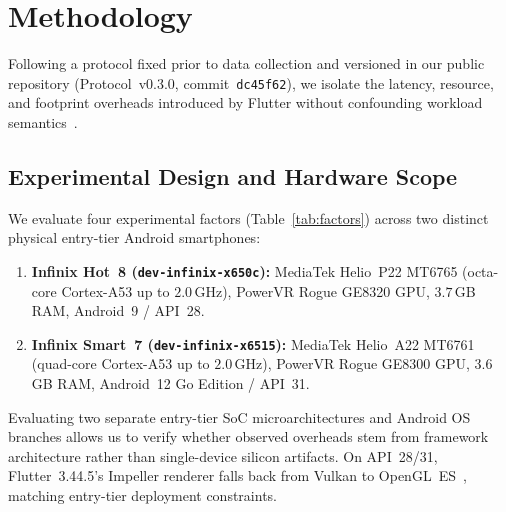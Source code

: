 \section{Methodology}\label{sec:method}

Following a protocol fixed prior to data collection and versioned in our public repository (Protocol~v0.3.0, commit~\texttt{dc45f62}), we isolate the latency, resource, and footprint overheads introduced by Flutter without confounding workload semantics~\cite{georges2007statistically,barrett2017virtual}.

\subsection{Experimental Design and Hardware Scope}
We evaluate four experimental factors (Table~\ref{tab:factors}) across two distinct physical entry-tier Android smartphones:
\begin{enumerate}
    \item \textbf{Infinix Hot~8 (\texttt{dev-infinix-x650c}):} MediaTek Helio~P22 MT6765 (octa-core Cortex-A53 up to $2.0$\,GHz), PowerVR Rogue GE8320 GPU, $3.7$\,GB RAM, Android~9 / API~28.
    \item \textbf{Infinix Smart~7 (\texttt{dev-infinix-x6515}):} MediaTek Helio~A22 MT6761 (quad-core Cortex-A53 up to $2.0$\,GHz), PowerVR Rogue GE8300 GPU, $3.6$\,GB RAM, Android~12 Go Edition / API~31.
\end{enumerate}
Evaluating two separate entry-tier SoC microarchitectures and Android OS branches allows us to verify whether observed overheads stem from framework architecture rather than single-device silicon artifacts. On API~28/31, Flutter~3.44.5's Impeller renderer falls back from Vulkan to OpenGL~ES~\cite{flutterimpeller2025}, matching entry-tier deployment constraints.

\begin{table}[t]
\caption{Full-Factorial Design Across Both Entry-Tier Devices}
\label{tab:factors}
\centering
{}
\end{table}

